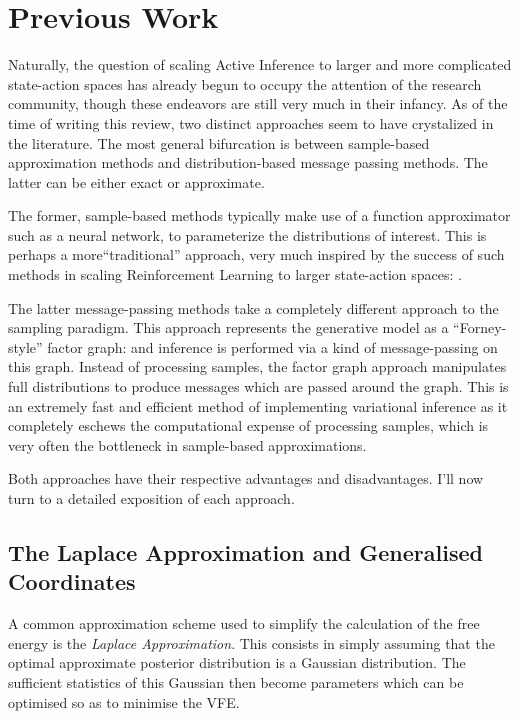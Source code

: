 \documentclass[onecolumn]{IEEEtran}
\begin{document}
\section{Previous Work}

Naturally, the question of scaling Active Inference to larger and more complicated state-action spaces has already begun to occupy the attention of the research community, though these endeavors are still very much in their infancy. As of the time of writing this review, two distinct approaches seem to have crystalized in the literature. The most general bifurcation is between sample-based approximation methods and distribution-based message passing methods. The latter can be either exact or approximate.

The former, sample-based methods typically make use of a function approximator such as a neural network, to parameterize the distributions of interest. This is perhaps a more``traditional'' approach, very much inspired by the success of such methods in scaling Reinforcement Learning to larger state-action spaces: \textcite{ATARI-Deep-RL}.

The latter message-passing methods take a completely different approach to the sampling paradigm. This approach represents the generative model as a ``Forney-style'' factor graph: \textcite{Codes-on-Graphs} and inference is performed via a kind of message-passing on this graph.  
Instead of processing samples, the factor graph approach manipulates full distributions to produce messages which are passed around the graph. This is an extremely fast and efficient method of implementing variational inference as it completely eschews the computational expense of processing samples, which is very often the bottleneck in sample-based approximations. 

Both approaches have their respective advantages and disadvantages. I'll now turn to a detailed exposition of each approach. 

\subsection{The Laplace Approximation and Generalised Coordinates}

A common approximation scheme used to simplify the calculation of the free energy is the \textit{Laplace Approximation}. This consists in simply assuming that the optimal approximate posterior distribution is a Gaussian distribution. The sufficient statistics of this Gaussian then become parameters which can be optimised so as to minimise the VFE. 
\end{document}
